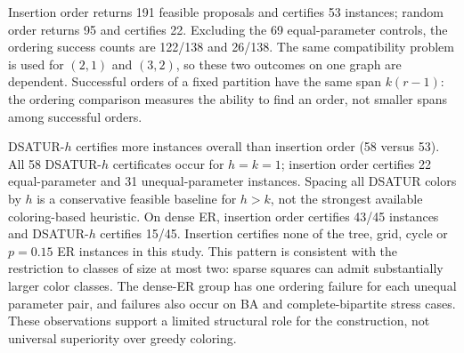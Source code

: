 \begin{table}[htbp]
\centering\small
\caption{Construction outcomes on 207 new instances.}
\label{tab:validation-methods}

\end{table}

\begin{table}[htbp]
\centering\small
\caption{Certificate coverage by graph family.}
\label{tab:validation-families}

\end{table}

Insertion order returns 191 feasible proposals and certifies 53 instances;
random order returns 95 and certifies 22. Excluding the 69 equal-parameter
controls, the ordering success counts are 122/138 and 26/138. The same
compatibility problem is used for $(2,1)$ and $(3,2)$, so these two outcomes
on one graph are dependent. Successful orders of a fixed partition have
the same span $k(r-1)$: the ordering comparison measures the ability to
find an order, not smaller spans among successful orders.

DSATUR-$h$ certifies more instances overall than insertion order (58
versus 53). All 58 DSATUR-$h$ certificates occur for $h=k=1$;
insertion order certifies 22 equal-parameter and 31 unequal-parameter
instances. Spacing all DSATUR colors by $h$ is a conservative feasible
baseline for $h>k$, not the strongest available coloring-based heuristic.
On dense ER, insertion order certifies 43/45 instances and DSATUR-$h$
certifies 15/45. Insertion certifies none of the tree, grid,
cycle or $p=0.15$ ER instances in this study. This pattern is consistent
with the restriction to classes of size at most two: sparse squares can
admit substantially larger color classes. The dense-ER group has one
ordering failure for each unequal parameter pair, and failures also
occur on BA and complete-bipartite stress cases. These observations
support a limited structural role for the construction, not universal
superiority over greedy coloring.

